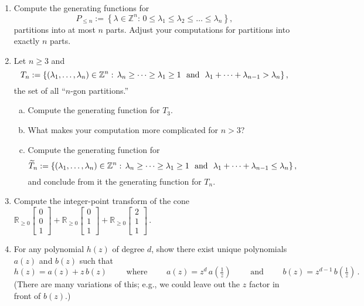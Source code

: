 \documentclass[11pt]{article}
\def\RR{\mathbb{R}}
\def\ZZ{\mathbb{Z}}
\begin{document}
\begin{enumerate}[(1)]
\vspace{-10pt}

\item Compute the generating functions for
\[
  P_{ \le n } := \left\{ \lambda \in \ZZ^n : \, 0 \le \lambda_1 \le \lambda_2 \le
\dots \le \lambda_n \right\} ,
\]
partitions into at most $n$ parts.
Adjust your computations for partitions into exactly $n$ parts.

\def\la{\lambda}

\item Let $n \ge 3$ and
\[
  T_n := \left\{ (\la_1, \dots , \la_n) \in \ZZ^n : \, \la_n \ge \cdots \ge \la_1 \ge 1 \ \text{ \rm and } \ \la_1 + \cdots + \la_{n-1} > \la_n \right\} ,
\]
the set of all ``$n$-gon partitions.''
\begin{enumerate}[(a)]
\item Compute the generating function for $T_3$.
\item What makes your computation more complicated for $n > 3$?
\item Compute the generating function for
\[
  \widetilde T_n := \left\{ (\la_1, \dots , \la_n) \in \ZZ^n : \, \la_n \ge \cdots
\ge \la_1 \ge 1 \ \text{ \rm and } \ \la_1 + \cdots + \la_{n-1} \le \la_n \right\} ,
\]
and conclude from it the generating function for $T_n$.
\end{enumerate}

\item Compute the integer-point transform of the cone
$
  \RR_{ \ge 0 } \begin{bmatrix} 0 \\ 0 \\ 1 \end{bmatrix} + 
  \RR_{ \ge 0 } \begin{bmatrix} 0 \\ 1 \\ 1 \end{bmatrix} + 
  \RR_{ \ge 0 } \begin{bmatrix} 2 \\ 1 \\ 1 \end{bmatrix} \, .
$

\item For any polynomial $h(z)$ of degree $d$, show there exist unique polynomials $a(z)$ and $b(z)$ such that
\[
  h(z) = a(z) + z \, b(z)
  \qquad \text{ where } \qquad a(z) = z^d \, a(\tfrac 1 z) \qquad \text{ and } \qquad b(z) = z^{ d-1 } \, b(\tfrac 1 z) \, .
\]
(There are many variations of this; e.g., we could leave out the $z$ factor in front of $b(z)$.)


\end{enumerate}
\end{document}
